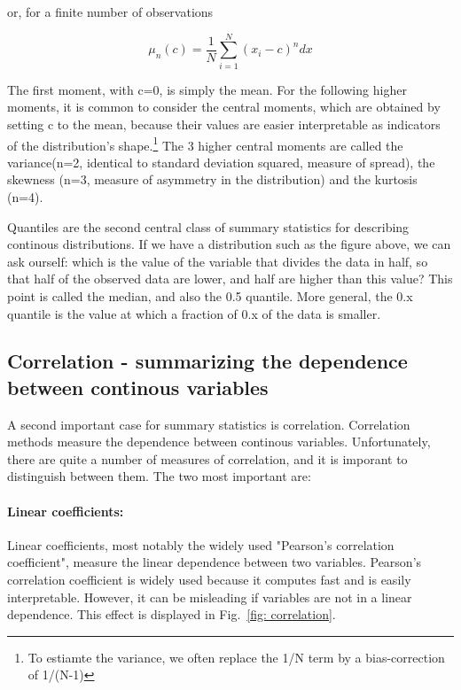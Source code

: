 \documentclass[a4paper,twoside]{tufte-book}\usepackage[]{graphicx}\usepackage[]{color}
\begin{document}
or, for a finite number of observations 

\begin{equation}
\mu_n(c) = \frac{1}{N}\sum_{i=1}^N (x_i - c)^n dx
\end{equation}

The first moment, with c=0, is simply the mean. For the following higher moments, it is common to consider the central moments, which are obtained by setting c to the mean, because their values are easier interpretable as indicators of the distribution's shape.\footnote{To estiamte the variance, we often replace the 1/N term by a bias-correction of 1/(N-1)} The 3 higher central moments are called the variance(n=2, identical to standard deviation squared, measure of spread), the skewness (n=3, measure of asymmetry in the distribution) and the kurtosis (n=4). 

Quantiles are the second central class of summary statistics for describing continous distributions. If we have a distribution such as the figure above, we can ask ourself: which is the value of the variable that divides the data in half, so that half of the observed data are lower, and half are higher than this value? This point is called the median, and also the 0.5 quantile. More general, the 0.x quantile is the value at which a fraction of 0.x of the data is smaller. 

\subsection{Correlation - summarizing the dependence between continous variables}

A second important case for summary statistics is correlation. Correlation methods measure the dependence between continous variables. Unfortunately, there are quite a number of measures of correlation, and it is imporant to distinguish between them. The two most important are:

\paragraph{Linear coefficients:}Linear coefficients, most notably the widely used "Pearson's correlation coefficient", measure the linear dependence between two variables. Pearson's correlation coefficient is widely used because it computes fast and is easily interpretable. However, it can be misleading if variables are not in a linear dependence. This effect is displayed in Fig.~\ref{fig: correlation}.
\end{document}
